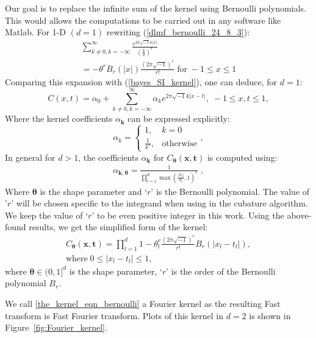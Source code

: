 \documentclass[twocolumn]{svjour3}          %
\newcommand{\bm}[1]{\boldsymbol{#1}}
\newcommand{\vtheta}{{\bm{\theta}}}
\newcommand{\vk}{\bm{k}}
\newcommand{\vt}{\bm{t}}
\newcommand{\vx}{\bm{x}}
\newcommand\figref{Figure~\ref}
\begin{document}
Our goal is to replace the infinite sum of the kernel using Bernoulli polynomials. This would allows the computations to be carried out in any software like Matlab.
For 1-D $(d=1)$ rewriting (\ref{dlmf_bernoulli_24_8_3}):
\begin{multline*}
\sum_{k \neq 0, k=-\infty}^\infty \frac{e^{2\pi\sqrt{-1} k |x|}}{ (\frac{k}{\theta})^{r}}
\\
=
-{\theta^r} B_{r}(|x|) \frac{(2 \pi \sqrt{-1})^{r}}{r!}
\; \text{for} \; -1 \leq x \leq 1
\end{multline*}
Comparing this expansion with (\ref{bayes_SI_kernel}), one can deduce, for $d=1$:
\[
C({x}, {t}) = 
\alpha_0 + \sum_{k \neq 0, k=-\infty}^\infty \alpha_k e^{2\pi\sqrt{-1} k |x-t|}   
, \; -1 \leq x,t \leq 1,
\]
Where the kernel coefficients ${\alpha}_{\vk}$ can be expressed explicitly:
\[
\alpha_k = 
\begin{cases}
1, & k=0 \\
\frac{1}{k^r}, & \text{otherwise}
\end{cases},
\]
In general for $d>1$, the coefficients $\alpha_{\vk}$ for $C_{\vtheta}(\vx,\vt)$ is computed using:
\begin{align*}
\alpha_{\vk, \vtheta} = \frac{1}{\prod_{l=1}^d \max(\frac{|k_l|}{\theta_l}, 1)^r} \; ,
\end{align*}
Where $\vtheta$ is the shape parameter and `$r$' is the Bernoulli polynomial. The value of '$r$' will be chosen specific to the integrand when using in the cubature algorithm. We keep the value of `$r$' to be even positive integer in this work.
Using the above-found results, we get the simplified form of the kernel:
\begin{multline}
\label{the_kernel_eqn_bernoulli}
C_\vtheta(\vx, \vt) =
 \prod_{l=1}^d
1 - \theta_l^r \frac{(2 \pi \sqrt{-1})^{r}}{r!} B_{r}( |{x_l-t_l}| ),
\\
\text{where} \; 0 \leq |x_l - t_l| \leq 1,
\end{multline}
where $\vtheta \in (0,1]^d$ is the {shape parameter}, `$r$' is the order of the Bernoulli polynomial $B_{r}$.

We call \eqref{the_kernel_eqn_bernoulli} a Fourier kernel as the resulting Fast transform is Fast Fourier transform. Plots of this kernel in $d=2$ is shown in \figref{fig:Fourier_kernel}.
\end{document}
